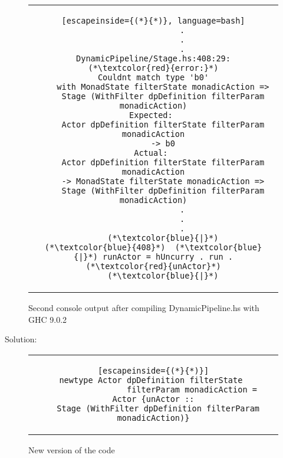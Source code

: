 \begin{figure}[H]
    \begin{tabular}{c}
        \begin{lstlisting}[escapeinside={(*}{*)}, language=bash]
            .
            .
            .
DynamicPipeline/Stage.hs:408:29: (*\textcolor{red}{error:}*)
Couldnt match type 'b0'
    with MonadState filterState monadicAction =>
    Stage (WithFilter dpDefinition filterParam monadicAction)
Expected: 
    Actor dpDefinition filterState filterParam monadicAction
    -> b0
Actual: 
    Actor dpDefinition filterState filterParam monadicAction
    -> MonadState filterState monadicAction =>
    Stage (WithFilter dpDefinition filterParam monadicAction)
            .
            .
            .
    (*\textcolor{blue}{|}*)
(*\textcolor{blue}{408}*)  (*\textcolor{blue}{|}*) runActor = hUncurry . run . (*\textcolor{red}{unActor}*)
    (*\textcolor{blue}{|}*)
        \end{lstlisting}
    \end{tabular}
    \caption{Second console output after compiling DynamicPipeline.hs with GHC 9.0.2}
    \label{fig:HC28}
\end{figure}

Solution:

\begin{figure}[H]
    \begin{tabular}{c}
        \begin{lstlisting}[escapeinside={(*}{*)}]
newtype Actor dpDefinition filterState 
                filterParam monadicAction =
Actor {unActor ::
  Stage (WithFilter dpDefinition filterParam monadicAction)}
        \end{lstlisting}
    \end{tabular}
    \caption{New version of the code}
    \label{fig:HC29}
\end{figure}



